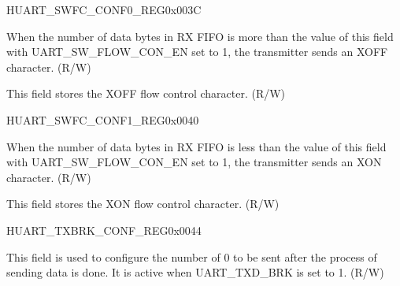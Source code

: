 \begin{register}{H}{UART\_SWFC\_CONF0\_REG}{0x003C}\label{regdesc:UARTSWFCCONF0REG}
%
%
%
\regnewline%
\begin{regdesc}\begin{reglist}
\label{fielddesc:UARTXOFFTHRESHOLD}\item [UART\_XOFF\_THRESHOLD] When the number of data bytes in RX FIFO is more than the value of this field with UART\_SW\_FLOW\_CON\_EN set to 1, the transmitter sends an XOFF character. (R/W)
\label{fielddesc:UARTXOFFCHAR}\item [UART\_XOFF\_CHAR] This field stores the XOFF flow control character. (R/W)
\end{reglist}\end{regdesc}
\end{register}


\begin{register}{H}{UART\_SWFC\_CONF1\_REG}{0x0040}\label{regdesc:UARTSWFCCONF1REG}
%
%
%
\regnewline%
\begin{regdesc}\begin{reglist}
\label{fielddesc:UARTXONTHRESHOLD}\item [UART\_XON\_THRESHOLD] When the number of data bytes in RX FIFO is less than the value of this field with UART\_SW\_FLOW\_CON\_EN set to 1, the transmitter sends an XON character. (R/W)
\label{fielddesc:UARTXONCHAR}\item [UART\_XON\_CHAR] This field stores the XON flow control character. (R/W)
\end{reglist}\end{regdesc}
\end{register}


\begin{register}{H}{UART\_TXBRK\_CONF\_REG}{0x0044}\label{regdesc:UARTTXBRKCONFREG}
%
%
\regnewline%
\begin{regdesc}\begin{reglist}
\label{fielddesc:UARTTXBRKNUM}\item [UART\_TX\_BRK\_NUM] This field is used to configure the number of 0 to be sent after the process of sending data is done. It is active when UART\_TXD\_BRK is set to 1. (R/W)
\end{reglist}\end{regdesc}
\end{register}


